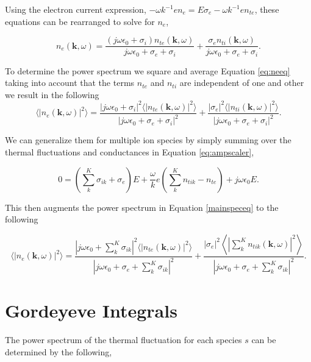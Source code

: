 \noindent Using the electron current expression, $-\omega k^{-1}en_e = E\sigma_e -\omega k^{-1}en_{te}$, these equations can be rearranged to solve for $n_e$, 

\begin{equation}
\label{eq:neeq}
n_e(\mathbf{k},\omega) =  \frac{(j\omega\epsilon_0 + \sigma_i) n_{te}(\mathbf{k},\omega)}{j\omega\epsilon_0 +\sigma_e+\sigma_i} + \frac{\sigma_en_{ti}(\mathbf{k},\omega)}{j\omega\epsilon_0 +\sigma_e+\sigma_i}.
\end{equation}

\noindent To determine the power spectrum we square and average Equation \ref{eq:neeq} taking into account that the terms $n_{te}$ and $n_{ti}$ are independent of one and other we result in the following
\begin{equation}
\label{mainspeceq}
\langle \left|n_e(\mathbf{k},\omega)\right|^2\rangle = \frac{|j\omega\epsilon_0 + \sigma_i|^2 \langle |n_{te}(\mathbf{k},\omega)|^2\rangle}{|j\omega\epsilon_0 +\sigma_e+\sigma_i|^2} + \frac{| \sigma_e|^2 \langle |n_{ti}(\mathbf{k},\omega)|^2\rangle}{|j\omega\epsilon_0 +\sigma_e+\sigma_i|^2}.
\end{equation}

We can generalize them for multiple ion species by simply summing over the thermal fluctuations and conductances in Equation \ref{eq:ampscaler},

\begin{equation} 
\label{eq:ampscalersum}
0=\left(\displaystyle \sum_k^K\sigma_{ik} +\sigma_e\right)E +\frac{\omega}{k}e\left(\sum_k^Kn_{tik}-n_{te}\right) +j\omega \epsilon_0 E.
\end{equation}

\noindent This then augments the power spectrum in Equation \ref{mainspeceq} to the following

\begin{equation}
\label{eq:sumspeceq}
\displaystyle \langle \left|n_e(\mathbf{k},\omega)\right|^2\rangle = \frac{\left|j\omega\epsilon_0 +  \sum_k^K\sigma_{ik} \right|^2 \langle |n_{te}(\mathbf{k},\omega)|^2\rangle}{\left|j\omega\epsilon_0 +\sigma_e+ \sum_k^K\sigma_{ik} \right|^2} + \frac{| \sigma_e|^2 \left \langle \left|\sum_k^Kn_{tik}(\mathbf{k},\omega)\right|^2\right\rangle}{\left|j\omega\epsilon_0 +\sigma_e+ \sum_k^K\sigma_{ik} \right|^2}.
\end{equation}

\section*{Gordeyeve Integrals}
The power spectrum of the thermal fluctuation for each species $s$ can be determined by the following,

